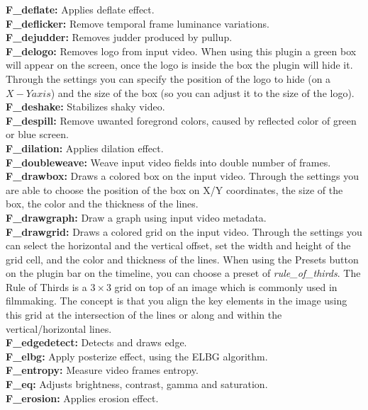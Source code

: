 \textbf{F\_deflate:} Applies deflate effect.\\
\textbf{F\_deflicker:} Remove temporal frame luminance variations.\\
\textbf{F\_dejudder:} Removes judder produced by pullup.\\
\textbf{F\_delogo:} Removes logo from input video. When using this plugin a green box will appear on the screen, once the logo is inside the box the plugin will hide it. Through the settings you can specify the position of the logo to hide (on a $X-Y axis$) and the size of the box (so you can adjust it to the size of the logo). \\
\textbf{F\_deshake:} Stabilizes shaky video.\\
\textbf{F\_despill:} Remove uwanted foregrond colors, caused by reflected color of green or blue screen.\\
\textbf{F\_dilation:} Applies dilation effect.\\
\textbf{F\_doubleweave:} Weave input video fields into double number of frames.\\
\textbf{F\_drawbox:} Draws a colored box on the input video. Through the settings you are able to choose the position of the box on X/Y coordinates, the size of the box, the color and the thickness of the lines.\\
\textbf{F\_drawgraph:} Draw a graph using input video metadata.\\
\textbf{F\_drawgrid:} Draws a colored grid on the input video. Through the settings you can select the horizontal and the vertical offset, set the width and height of the grid cell, and the color and thickness of the lines. When using the Presets button on the plugin bar on the timeline, you can choose a preset of \textit{rule\_of\_thirds}. The Rule of Thirds is a $3\times3$ grid on top of an image which is commonly used in filmmaking. The concept is that you align the key elements in the image using this grid at the intersection of the lines or along and within the vertical/horizontal lines.\\ 
\textbf{F\_edgedetect:} Detects and draws edge.\\
\textbf{F\_elbg:} Apply posterize effect, using the ELBG algorithm.\\
\textbf{F\_entropy:} Measure video frames entropy.\\
\textbf{F\_eq:} Adjusts brightness, contrast, gamma and saturation.\\
\textbf{F\_erosion:} Applies erosion effect.\\

